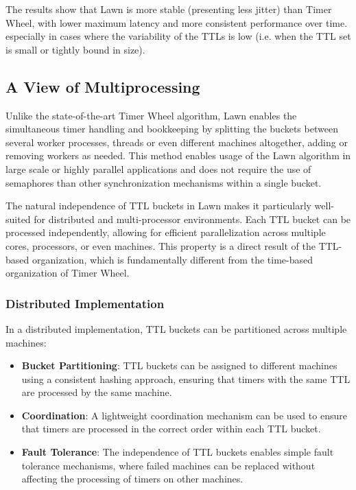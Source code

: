 \documentclass[conference]{IEEEtran}
\begin{document}
The results show that Lawn is more stable (presenting less jitter) than Timer Wheel, with lower maximum latency and more consistent performance over time. especially in cases where the variability of the TTLs is low (i.e. when the TTL set is small or tightly bound in size).

\subsection{A View of Multiprocessing}
Unlike the state-of-the-art Timer Wheel algorithm, Lawn enables the simultaneous timer handling and bookkeeping by splitting the buckets between several worker processes, threads or even different machines altogether, adding or removing workers as needed. This method enables usage of the Lawn algorithm in large scale or highly parallel applications and does not require the use of semaphores than other synchronization mechanisms within a single bucket.

The natural independence of TTL buckets in Lawn makes it particularly well-suited for distributed and multi-processor environments. Each TTL bucket can be processed independently, allowing for efficient parallelization across multiple cores, processors, or even machines. This property is a direct result of the TTL-based organization, which is fundamentally different from the time-based organization of Timer Wheel.

\subsubsection{Distributed Implementation}
In a distributed implementation, TTL buckets can be partitioned across multiple machines:

\begin{itemize}
    \item \textbf{Bucket Partitioning}: TTL buckets can be assigned to different machines using a consistent hashing approach, ensuring that timers with the same TTL are processed by the same machine.
    
    \item \textbf{Coordination}: A lightweight coordination mechanism can be used to ensure that timers are processed in the correct order within each TTL bucket.
    
    \item \textbf{Fault Tolerance}: The independence of TTL buckets enables simple fault tolerance mechanisms, where failed machines can be replaced without affecting the processing of timers on other machines.
\end{itemize}
\end{document}
